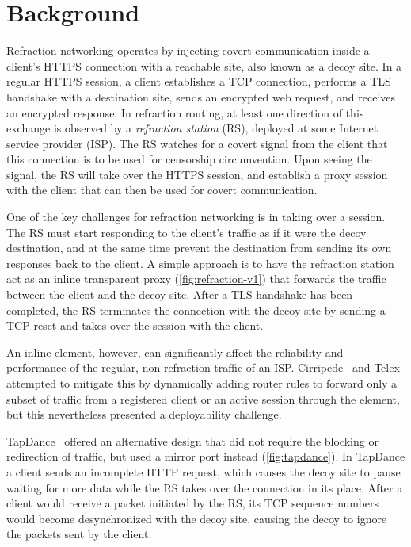 \section{Background}

Refraction networking operates by injecting covert communication inside a
client's HTTPS connection with a reachable site, also known as a decoy site. In
a regular HTTPS session, a client establishes a TCP connection, performs a TLS
handshake with a destination site, sends an encrypted web request, and
receives an encrypted response. In refraction routing, at least one direction
of this exchange is observed by a \emph{refraction station} (RS), deployed at
some Internet service provider (ISP). The RS watches for a covert signal from
the client that this connection is to be used for censorship circumvention.
Upon seeing the signal, the RS will take over the HTTPS session,
and establish a proxy session with the client that can then be used for covert
communication.

\FigEvolution

One of the key challenges for refraction networking is in taking over a session. The RS must start responding to the client's traffic as if it were the decoy destination, and at the same time prevent the destination from sending its own responses back to the client. A simple approach is to have the refraction station act as an inline transparent proxy (\cref{fig:refraction-v1}) that forwards the traffic between the client and the decoy site. After a TLS handshake has been completed, the RS terminates the connection with the decoy site by sending a TCP reset and takes over the session with the client.

An inline element, however, can significantly affect the reliability and performance of the regular, non-refraction traffic of an ISP. Cirripede~\cite{cirripede} and Telex~\cite{telex} attempted to mitigate this by dynamically adding router rules to forward only a subset of traffic from a registered client or an active session through the element, but this nevertheless presented a deployability challenge.

TapDance~\cite{tapdance} offered an alternative design that did not require the blocking or redirection of traffic, but used a mirror port instead (\cref{fig:tapdance}). In TapDance a client sends an incomplete HTTP request, which causes the decoy site to pause waiting for more data while the RS takes over the connection in its place. After a client would receive a packet initiated by the RS, its TCP sequence numbers would become desynchronized with the decoy site, causing the decoy to ignore the packets sent by the client.

